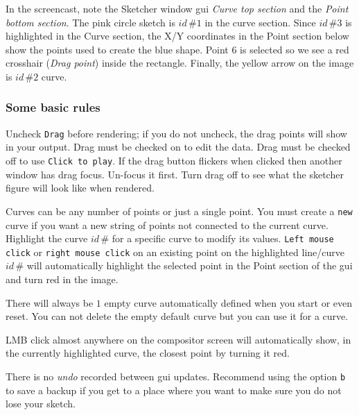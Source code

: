 In the screencast, note the Sketcher window gui \textit{Curve top section} and the \textit{Point bottom section}. The pink circle sketch is $id\, \#1$ in the curve section. Since $id\, \#3$ is highlighted in the Curve section, the X/Y coordinates in the Point section below show the points used to create the blue shape. Point 6 is selected so we see a red crosshair (\textit{Drag point}) inside the rectangle. Finally, the yellow arrow on the image is $id\, \#2$ curve.

\subsubsection*{Some basic rules}%
\label{ssub:some_basic_rules}

Uncheck \texttt{Drag} before rendering; if you do not uncheck, the drag points will show in your output.
Drag must be checked on to edit the data. Drag must be checked off to use \texttt{Click to play}.
If the drag button flickers when clicked then another window has drag focus. Un-focus it first.
Turn drag off to see what the sketcher figure will look like when rendered.

Curves can be any number of points or just a single point.
You must create a \texttt{new} curve if you want a new string of points not connected to the current curve.
Highlight the curve $id\, \#$ for a specific curve to modify its values.
\texttt{Left mouse click} or \texttt{right mouse click} on an existing point on the highlighted line/curve $id\, \#$ will automatically highlight the selected point in the Point section of the gui and turn red in the image.

There will always be $1$ empty curve automatically defined when you start or even reset.
You can not delete the empty default curve but you can use it for a curve.

LMB click almost anywhere on the compositor screen will automatically show, in the currently highlighted curve, the closest point by turning it red.

There is no \textit{undo} recorded between gui updates. Recommend using the option \texttt{b} to save a backup if you get to a place where you want to make sure you do not lose your sketch.

